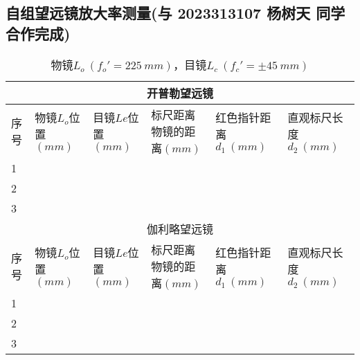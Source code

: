 \documentclass{ctexart}
\begin{document}
\subsection{自组望远镜放大率测量\small{(与 2023313107 杨树天 同学合作完成)}}

\begin{table}[!h]
    \renewcommand\arraystretch{1.2}
    \centering
    \caption{物镜$L_o \ (f_o' = 225 \ mm)$，目镜$L_c \ (f_c' = \pm 45 \ mm)$}
    \begin{tabular}{|m{0.8cm}<{\centering}|m{1.5cm}<{\centering}|m{1.5cm}<{\centering}|m{1.5cm}<{\centering}|m{1.5cm}<{\centering}|m{1.5cm}<{\centering}|}
        \hline
        \multicolumn{6}{|c|}{开普勒望远镜}\\
        \hline
        \small{序号}& \small{物镜$L_o$位置$(mm)$} & \small{目镜$Le$位置$(mm)$} & \small{标尺距离物镜的距离$(mm)$} & \small{红色指针距离$d_1 \ (mm)$} & \small{直观标尺长度$d_2 \ (mm)$} \\ 
        \hline
        1& & & & & \\
        \hline
        2& & & & & \\
        \hline
        3& & & & & \\
        \hline
        \multicolumn{6}{|c|}{伽利略望远镜}\\
        \hline
        \small{序号}& \small{物镜$L_o$位置$(mm)$} & \small{目镜$Le$位置$(mm)$} & \small{标尺距离物镜的距离$(mm)$} & \small{红色指针距离$d_1 \ (mm)$} & \small{直观标尺长度$d_2 \ (mm)$} \\ 
        \hline
        1& & & & & \\
        \hline
        2& & & & & \\
        \hline
        3& & & & & \\
        \hline
    \end{tabular}
\end{table}

\end{document}
